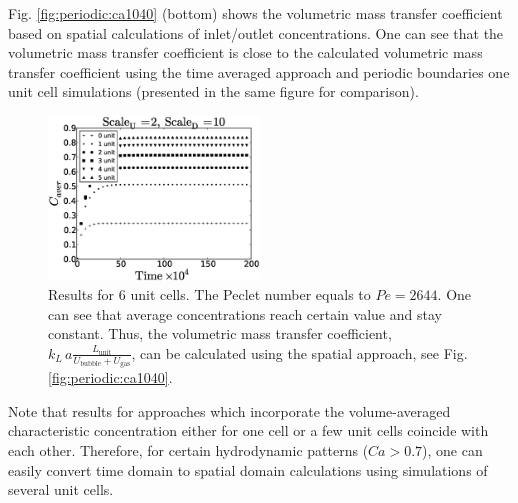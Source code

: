 \documentclass{article}
\newcommand{\vol}{k_L\,a}
\newcommand{\lunit}{L_{\mathrm{unit}}}
\newcommand{\ububble}{U_{\mathrm{bubble}}}
\newcommand{\ugas}{U_{\mathrm{gas}}}
\newcommand{\volnondim}{\vol \frac{\lunit}{\ububble+\ugas}}
\begin{document}
Fig. \ref{fig:periodic:ca1040}
(bottom) shows the volumetric mass transfer coefficient based on spatial calculations of
inlet/outlet concentrations. One can see that the volumetric mass transfer coefficient is close to
the calculated volumetric mass transfer coefficient using the time averaged approach and periodic
boundaries one unit cell simulations (presented in the same figure for comparison).
\begin{figure}[htb!]
\begin{center}
\includegraphics[width=0.5\textwidth]{Figures/aver_units6scaleu2scaled5.eps}
\end{center}
\caption{Results for $6$ unit cells. The Peclet number equals to $Pe=2644$.
One can see that average concentrations reach certain value and stay constant.
Thus, the volumetric mass transfer coefficient, $\volnondim$, can be
calculated using the spatial approach, see Fig.
\ref{fig:periodic:ca1040}.
\label{fig:6:units:ca1040}}
\end{figure}
Note
that results for approaches which incorporate the volume-averaged characteristic concentration either for one cell or a few unit cells coincide with each other. Therefore, for certain hydrodynamic patterns ($Ca>0.7$), one can
easily convert time domain to spatial domain calculations using simulations of several unit cells.
\end{document}
